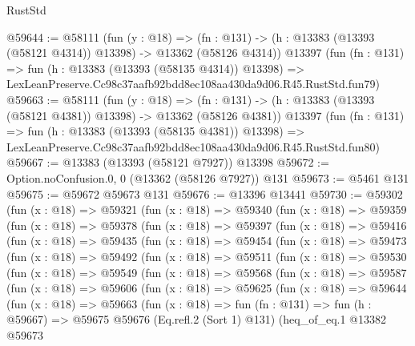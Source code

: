 \begin{lexlean}{RustStd}
\begin{coremodule}
@59644 := @58111
    (fun (y : @18) =>
    (fn : @131) -> (h : @13383 (@13393 (@58121 @4314)) @13398) -> @13362 (@58126 @4314))
    @13397
    (fun (fn : @131) =>
    fun (h : @13383 (@13393 (@58135 @4314)) @13398) =>
    LexLeanPreserve.Cc98c37aafb92bdd8ec108aa430da9d06.R45.RustStd.fun79)
@59663 := @58111
    (fun (y : @18) =>
    (fn : @131) -> (h : @13383 (@13393 (@58121 @4381)) @13398) -> @13362 (@58126 @4381))
    @13397
    (fun (fn : @131) =>
    fun (h : @13383 (@13393 (@58135 @4381)) @13398) =>
    LexLeanPreserve.Cc98c37aafb92bdd8ec108aa430da9d06.R45.RustStd.fun80)
@59667 := @13383 (@13393 (@58121 @7927)) @13398
@59672 := Option.noConfusion.{0, 0} (@13362 (@58126 @7927)) @131
@59673 := @5461 @131
@59675 := @59672 @59673 @131
@59676 := @13396 @13441
@59730 := @59302
    (fun (x : @18) =>
    @59321
      (fun (x : @18) =>
      @59340
        (fun (x : @18) =>
        @59359
          (fun (x : @18) =>
          @59378
            (fun (x : @18) =>
            @59397
              (fun (x : @18) =>
              @59416
                (fun (x : @18) =>
                @59435
                  (fun (x : @18) =>
                  @59454
                    (fun (x : @18) =>
                    @59473
                      (fun (x : @18) =>
                      @59492
                        (fun (x : @18) =>
                        @59511
                          (fun (x : @18) =>
                          @59530
                            (fun (x : @18) =>
                            @59549
                              (fun (x : @18) =>
                              @59568
                                (fun (x : @18) =>
                                @59587
                                  (fun (x : @18) =>
                                  @59606
                                    (fun (x : @18) =>
                                    @59625
                                      (fun (x : @18) =>
                                      @59644
                                        (fun (x : @18) =>
                                        @59663
                                          (fun (x : @18) =>
                                          fun (fn : @131) =>
                                          fun (h : @59667) =>
                                          @59675
                                            @59676
                                            (Eq.refl.{2} (Sort 1) @131)
                                            (heq_of_eq.{1}
                                              @13382
                                              @59673

\end{coremodule}
\end{lexlean}
